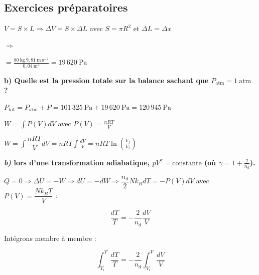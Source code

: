 \documentclass	[11pt, a4paper, openany]{book}
\begin{document}
	\subsection{Exercices préparatoires}


	$V = S \times L \Rightarrow \Delta V = S \times \Delta L$ avec $S = \pi R^2$ et $\Delta L = \Delta x$
	
	$\Rightarrow$ 

\vspace{0,5cm}

	
	 $= \frac{80\ \text{kg}\ 9,81\ \text{m}\ \text{s}^{-2}}{0,04\ \text{m}^2} = 19\,620\ \text{Pa}$
	
	\textbf{b) Quelle est la pression totale sur la balance sachant que $P_{\text{atm}} = 1\ \text{atm}$ ?}
	
	$P_{\text{tot}} = P_{\text{atm}} + P = 101\,325\ \text{Pa} + 19\,620\ \text{Pa} = 120\,945\ \text{Pa}$

\vspace{0,5cm}

	
	$W = \int P(V)dV$ avec $P(V) = \frac{nRT}{V}$
	
	$W = \int \dfrac{nRT}{V} dV = nRT \int \frac{dV}{V} = nRT \ln(\frac{V_f}{V_i})$
	
	\textbf{\textit{b)} lors d’une transformation adiabatique, $pV^{\gamma} = \text{constante}$ (où $\gamma = 1 + \frac{2}{n_d}$).}
	
	$Q = 0 \Rightarrow \Delta U = -W \Rightarrow dU = -dW \Rightarrow \dfrac{n_d}{2}Nk_BdT = -P(V)dV $ avec $P(V) = \dfrac{Nk_BT}{V}$ :
	
	$$\dfrac{dT}{T} = -\dfrac{2}{n_d}\dfrac{dV}{V}$$
	
	Intégrons membre à membre :
	
	$$\int_{T_i}^{T} \frac{dT}{T} = -\frac{2}{n_d} \int_{V_i}^{V} \frac{dV}{V}$$
	
\end{document}
